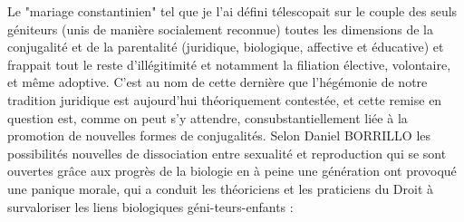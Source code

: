  Le "mariage constantinien" tel que je l'ai défini télescopait sur le couple des seuls géniteurs (unis de manière socialement reconnue) toutes les dimensions de la conjugalité et de la parentalité (juridique, biologique, affective et éducative) et frappait tout le reste d'illégitimité et notamment la filiation élective, volontaire, et même adoptive. C'est au nom de cette dernière que l'hégémonie de notre tradition juridique est aujourd’hui théoriquement contestée, et cette remise en question est, comme on peut s'y attendre, consubstantiellement liée à la promotion de nouvelles formes de conjugalités. Selon Daniel BORRILLO  les possibilités nouvelles de dissociation entre sexualité et reproduction qui se sont ouvertes grâce aux progrès de la biologie en à peine une génération ont provoqué une panique morale, qui a conduit les théoriciens et les praticiens du Droit à survaloriser les liens biologiques géni-teurs-enfants :
